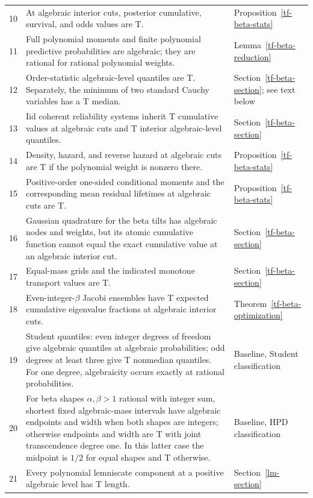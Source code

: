 \documentclass[11pt,a4paper]{article}
\theoremstyle{definition}
\theoremstyle{remark}
\numberwithin{equation}{section}
\begin{document}
\begin{longtable}{@{}L{.055\textwidth}L{.68\textwidth}L{.205\textwidth}@{}}
10 & At algebraic interior cuts, posterior cumulative, survival, and odds values are T. & Proposition~\ref{tf-beta-stats}\\
11 & Full polynomial moments and finite polynomial predictive probabilities are algebraic; they are rational for rational polynomial weights. & Lemma~\ref{tf-beta-reduction}\\
12 & Order-statistic algebraic-level quantiles are T.  Separately, the minimum of two standard Cauchy variables has a T median. & Section~\ref{tf-beta-section}; see text below\\
13 & Iid coherent reliability systems inherit T cumulative values at algebraic cuts and T interior algebraic-level quantiles. & Section~\ref{tf-beta-section}\\
14 & Density, hazard, and reverse hazard at algebraic cuts are T if the polynomial weight is nonzero there. & Proposition~\ref{tf-beta-stats}\\
15 & Positive-order one-sided conditional moments and the corresponding mean residual lifetimes at algebraic cuts are T. & Proposition~\ref{tf-beta-stats}\\
16 & Gaussian quadrature for the beta tilts has algebraic nodes and weights, but its atomic cumulative function cannot equal the exact cumulative value at an algebraic interior cut. & Section~\ref{tf-beta-section}\\
17 & Equal-mass grids and the indicated monotone transport values are T. & Section~\ref{tf-beta-section}\\
18 & Even-integer-$\beta$ Jacobi ensembles have T expected cumulative eigenvalue fractions at algebraic interior cuts. & Theorem~\ref{tf-beta-optimization}\\
19 & Student quantiles: even integer degrees of freedom give algebraic quantiles at algebraic probabilities; odd degrees at least three give T nonmedian quantiles.  For one degree, algebraicity occurs exactly at rational probabilities. & Baseline, Student classification\\
20 & For beta shapes $\alpha,\beta>1$ rational with integer sum, shortest fixed algebraic-mass intervals have algebraic endpoints and width when both shapes are integers; otherwise endpoints and width are T with joint transcendence degree one.  In this latter case the midpoint is $1/2$ for equal shapes and T otherwise. & Baseline, HPD classification\\
21 & Every polynomial lemniscate component at a positive algebraic level has T length. & Section~\ref{lm-section}\\

\end{longtable}
\end{document}
